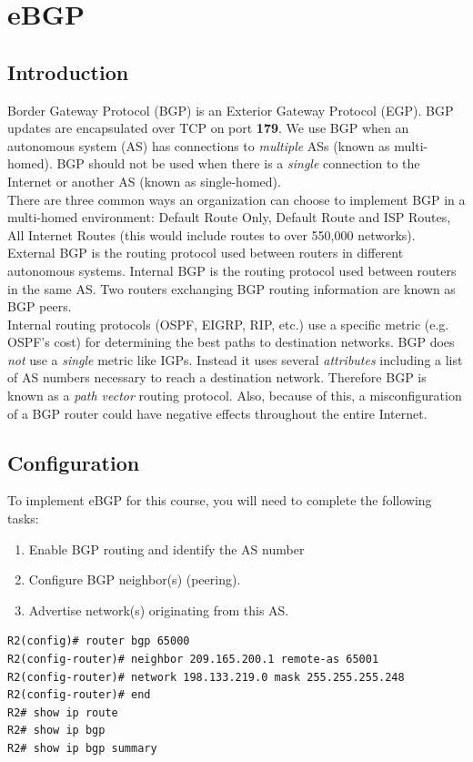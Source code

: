 \section{eBGP}

\subsection{Introduction}

Border Gateway Protocol (BGP) is an Exterior Gateway Protocol (EGP). BGP updates are encapsulated over TCP on port \textbf{179}. We use BGP when an autonomous system (AS) has connections to \emph{multiple} ASs (known as multi-homed). BGP should not be used when there is a \emph{single} connection to the Internet or another AS (known as single-homed).\\

There are three common ways an organization can choose to implement BGP in a multi-homed environment: Default Route Only, Default Route and ISP Routes, All Internet Routes (this would include routes to over 550,000 networks).\\

External BGP is the routing protocol used between routers in different autonomous systems. Internal BGP is the routing protocol used between routers in the same AS. Two routers exchanging BGP routing information are known as BGP peers.\\

Internal routing protocols (OSPF, EIGRP, RIP, etc.) use a specific metric (e.g. OSPF’s cost) for determining the best paths to destination networks. BGP does \emph{not} use a \emph{single} metric like IGPs. Instead it uses several \emph{attributes} including a list of AS numbers necessary to reach a destination network. Therefore BGP is known as a \emph{path vector} routing protocol. Also, because of this, a misconfiguration of a BGP router could have negative effects throughout the entire Internet.

\subsection{Configuration}

To implement eBGP for this course, you will need to complete the following tasks:
\begin{enumerate}
\item Enable BGP routing and identify the AS number
\item Configure BGP neighbor(s) (peering).
\item Advertise network(s) originating from this AS.
\end{enumerate}

\begin{verbatim}
R2(config)# router bgp 65000 
R2(config-router)# neighbor 209.165.200.1 remote-as 65001
R2(config-router)# network 198.133.219.0 mask 255.255.255.248 
R2(config-router)# end
R2# show ip route
R2# show ip bgp 
R2# show ip bgp summary
\end{verbatim}

